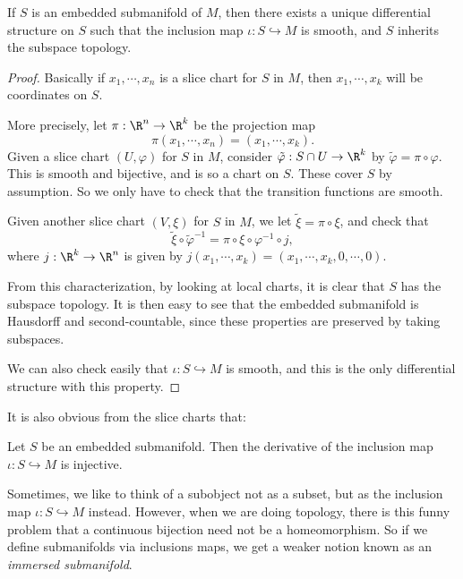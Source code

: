 \documentclass[a4paper]{article}
\begin{document}
\begin{lemma}
  If $S$ is an embedded submanifold of $M$, then there exists a unique differential structure on $S$ such that the inclusion map $\iota: S \hookrightarrow M$ is smooth, and $S$ inherits the subspace topology.
\end{lemma}

\begin{proof}
  Basically if $x_1, \cdots, x_n$ is a slice chart for $S$ in $M$, then $x_1, \cdots, x_k$ will be coordinates on $S$.

  More precisely, let $\pi: \R^n \to \R^k$ be the projection map
  \[
    \pi(x_1, \cdots, x_n) = (x_1, \cdots, x_k).
  \]
  Given a slice chart $(U, \varphi)$ for $S$ in $M$, consider $\tilde{\varphi}: S \cap U \to \R^k$ by $\tilde{\varphi} = \pi \circ \varphi$. This is smooth and bijective, and is so a chart on $S$. These cover $S$ by assumption. So we only have to check that the transition functions are smooth.

  Given another slice chart $(V, \xi)$ for $S$ in $M$, we let $\tilde{\xi} = \pi \circ \xi$, and check that
  \[
    \tilde{\xi} \circ \tilde{\varphi}^{-1} = \pi \circ \xi \circ \varphi^{-1} \circ j,
  \]
  where $j: \R^k \to \R^n$ is given by $j(x_1, \cdots, x_k) = (x_1, \cdots, x_k, 0, \cdots, 0)$.

  From this characterization, by looking at local charts, it is clear that $S$ has the subspace topology. It is then easy to see that the embedded submanifold is Hausdorff and second-countable, since these properties are preserved by taking subspaces.

  We can also check easily that $\iota: S \hookrightarrow M$ is smooth, and this is the only differential structure with this property.
\end{proof}

It is also obvious from the slice charts that:
\begin{prop}
  Let $S$ be an embedded submanifold. Then the derivative of the inclusion map $\iota: S \hookrightarrow M$ is injective.
\end{prop}

Sometimes, we like to think of a subobject not as a subset, but as the inclusion map $\iota: S \hookrightarrow M$ instead. However, when we are doing topology, there is this funny problem that a continuous bijection need not be a homeomorphism. So if we define submanifolds via inclusions maps, we get a weaker notion known as an \emph{immersed submanifold}.
\end{document}
